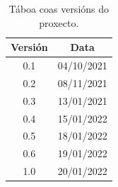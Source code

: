 \documentclass[11pt,a4paper,titlepage,twoside,openright,openbib]{report}
\begin{document}

 
 \setcounter{page}{1}

\begin{table}[h!]
\centering
\begin{tabular}{||c | c||} 
 \hline
 \textbf{Versión} & \textbf{Data}\\ [1ex] 
 \hline\hline
 0.1 & 04/10/2021\\
  [1ex] 
 \hline
 0.2 & 08/11/2021\\
  [1ex] 
 \hline
 0.3 & 13/01/2021\\
  [1ex] 
 \hline
  0.4 & 15/01/2022\\
  [1ex] 
 \hline
 0.5 & 18/01/2022\\
  [1ex] 
 \hline
 0.6 & 19/01/2022\\
  [1ex] 
 \hline
 \hline
 1.0 & 20/01/2022\\
  [1ex]
\end{tabular}
\caption{Táboa coas versións do proxecto.}
\label{table:1}
\end{table}

\let\cleardoublepage=\clearpage 

 \tableofcontents

\vspace{30pt}


 
 

 \setcounter{page}{1}
 
  
 
 
  \let\cleardoublepage=\clearpage 
 



 

 
 
 
 
 

 
\end{document}

